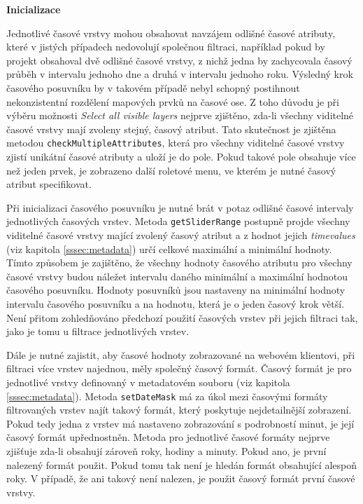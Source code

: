 \bigskip
\noindent \textbf{Inicializace}

Jednotlivé časové vrstvy mohou obsahovat navzájem odlišné
časové atributy, které v jistých případech nedovolují společnou
filtraci, například pokud by projekt obsahoval dvě odlišné časové
vrstvy, z nichž jedna by zachycovala časový průběh v intervalu jednoho dne
a druhá v intervalu jednoho roku. Výsledný krok časového posuvníku by
v takovém případě nebyl schopný postihnout nekonzistentní rozdělení
mapových prvků na časové ose. Z toho důvodu je při výběru možnosti
\textit{Select all visible layers} nejprve zjištěno, zda-li všechny
viditelné časové vrstvy mají zvoleny stejný, časový
atribut. Tato skutečnost je zjištěna metodou \verb|checkMultipleAttributes|,
která pro všechny viditelné časové vrstvy zjistí unikátní časové
atributy a uloží je do pole. Pokud takové pole obsahuje více než jeden
prvek, je zobrazeno další roletové menu, ve kterém je nutné časový
atribut specifikovat.

Při inicializaci časového posuvníku je nutné brát v potaz
odlišné časové intervaly jednotlivých časových vrstev. Metoda
\verb|getSliderRange| postupně projde všechny viditelné
časové vrstvy mající zvolený časový atribut a z hodnot jejich
\textit{time\textunderscore values} (viz kapitola \ref{sssec:metadata}) určí
celkové maximální a minimální hodnoty. Tímto způsobem je zajištěno,
že všechny hodnoty časového atributu pro všechny časové vrstvy budou
náležet intervalu daného minimální a maximální hodnotou časového
posuvníku. Hodnoty posuvníků jsou nastaveny na minimální hodnoty
intervalu časového posuvníku a na hodnotu, která je o jeden časový
krok větší. Není přitom zohledňováno předchozí použití časových
vrstev při jejich filtraci tak, jako je tomu u filtrace jednotlivých vrstev.

Dále je nutné zajistit, aby časové hodnoty zobrazované na webovém
klientovi, při filtraci více vrstev najednou, měly společný časový
formát. Časový formát je pro jednotlivé vrstvy definovaný v metadatovém
souboru (viz kapitola \ref{sssec:metadata}). Metoda \verb|setDateMask|
má za úkol mezi časovými formáty filtrovaných vrstev najít takový formát,
který poskytuje nejdetailnější zobrazení. Pokud tedy jedna z vrstev
má nastaveno zobrazování s podrobností minut, je její časový
formát upřednostněn. Metoda pro jednotlivé časové formáty nejprve
zjišťuje zda-li obsahují zároveň roky, hodiny a minuty. Pokud ano, je
první nalezený formát použit. Pokud tomu tak není je hledán formát
obsahující alespoň roky. V případě, že ani takový není nalezen,
je použit časový formát první časové vrstvy.

